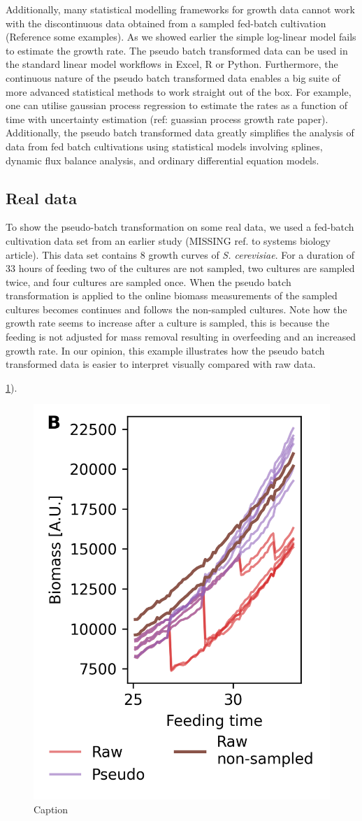 \documentclass{bioinfo}
\begin{document}
Additionally, many statistical modelling frameworks for growth data cannot work with the discontinuous data obtained from a sampled fed-batch cultivation (Reference some examples). As we showed earlier the simple log-linear model fails to estimate the growth rate. The pseudo batch transformed data can be used in the standard linear model workflows in Excel, R or Python. Furthermore, the continuous nature of the pseudo batch transformed data enables a big suite of more advanced statistical methods to work straight out of the box. For example, one can utilise gaussian process regression to estimate the rates as a function of time with uncertainty estimation (ref: guassian process growth rate paper). Additionally, the pseudo batch transformed data greatly simplifies the analysis of data from fed batch cultivations using statistical models involving splines, dynamic flux balance analysis, and ordinary differential equation models.

\subsection{Real data}
To show the pseudo-batch transformation on some real data, we used a fed-batch cultivation data set from an earlier study (MISSING ref. to systems biology article). This data set contains 8 growth curves of \textit{S. cerevisiae}. For a duration of 33 hours of feeding two of the cultures are not sampled, two cultures are sampled twice, and four cultures are sampled once. When the pseudo batch transformation is applied to the online biomass measurements of the sampled cultures becomes continues and follows the non-sampled cultures. Note how the growth rate seems to increase after a culture is sampled, this is because the feeding is not adjusted for mass removal resulting in overfeeding and an increased growth rate. In our opinion, this example illustrates how the pseudo batch transformed data is easier to interpret visually compared with raw data.

\ref{fig:real_data}).

\begin{figure}
    \centering
    \includegraphics[width = 0.4 \textwidth]{figures/real-data-compare-paper.png}
    \caption{Caption}
    \label{fig:real_data}
\end{figure}
\end{document}
